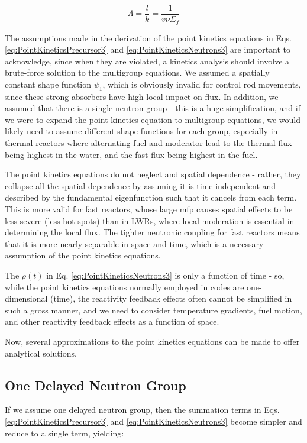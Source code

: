 \documentclass[10pt]{article}
\begin{document}
\begin{flushleft}
\begin{equation}
\label{eq:MeanNeutronGenerationTime}
\Lambda=\frac{l}{k}=\frac{1}{v\nu\Sigma_f}
\end{equation} 

The assumptions made in the derivation of the point kinetics equations in Eqs. \ref{eq:PointKineticsPrecursor3} and \ref{eq:PointKineticsNeutrons3} are important to acknowledge, since when they are violated, a kinetics analysis should involve a brute-force solution to the multigroup equations. We assumed a spatially constant shape function \(\psi_1\), which is obviously invalid for control rod movements, since these strong absorbers have high local impact on flux. In addition, we assumed that there is a single neutron group - this is a huge simplification, and if we were to expand the point kinetics equation to multigroup equations, we would likely need to assume different shape functions for each group, especially in thermal reactors where alternating fuel and moderator lead to the thermal flux being highest in the water, and the fast flux being highest in the fuel. 

The point kinetics equations do not neglect and spatial dependence - rather, they collapse all the spatial dependence by assuming it is time-independent and described by the fundamental eigenfunction such that it cancels from each term. This is more valid for fast reactors, whose large mfp causes spatial effects to be less severe (less hot spots) than in LWRs, where local moderation is essential in determining the local flux. The tighter neutronic coupling for fast reactors means that it is more nearly separable in space and time, which is a necessary assumption of the point kinetics equations. 

The \(\rho(t)\) in Eq. \ref{eq:PointKineticsNeutrons3} is only a function of time - so, while the point kinetics equations normally employed in codes are one-dimensional (time), the reactivity feedback effects often cannot be simplified in such a gross manner, and we need to consider temperature gradients, fuel motion, and other reactivity feedback effects as a function of space. 

Now, several approximations to the point kinetics equations can be made to offer analytical solutions.


\subsection{One Delayed Neutron Group}
If we assume one delayed neutron group, then the summation terms in Eqs. \ref{eq:PointKineticsPrecursor3} and \ref{eq:PointKineticsNeutrons3} become simpler and reduce to a single term, yielding:


\end{flushleft}
\end{document}
